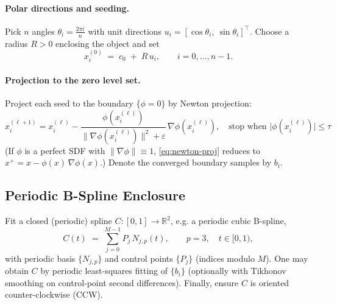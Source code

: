 \documentclass[conference]{IEEEtran}
\begin{document}
\paragraph{Polar directions and seeding.}
Pick $n$ angles $\theta_i=\tfrac{2\pi i}{n}$ with unit directions $u_i=[\cos\theta_i,\ \sin\theta_i]^\top$. Choose a radius $R>0$ enclosing the object and set
\begin{equation}
x_i^{(0)} \;=\; c_0 \;+\; R\,u_i,\qquad i=0,\dots,n-1.
\end{equation}

\paragraph{Projection to the zero level set.}
Project each seed to the boundary $\{\phi=0\}$ by Newton projection:
\begin{equation}
x_i^{(\ell+1)} = x_i^{(\ell)} - \frac{\phi\!\left(x_i^{(\ell)}\right)}{\|\nabla\phi\!\left(x_i^{(\ell)}\right)\|^2+\varepsilon}\,\nabla\phi\!\left(x_i^{(\ell)}\right),
\quad \text{stop when } \big|\phi(x_i^{(\ell)})\big| \le \tau
\label{eq:newton-proj}
\end{equation}
(If $\phi$ is a perfect SDF with $\|\nabla\phi\|\equiv 1$, \eqref{eq:newton-proj} reduces to $x^+ = x - \phi(x)\,\nabla\phi(x)$.) Denote the converged boundary samples by $b_i$.

\subsection{Periodic B-Spline Enclosure}
\noindent Fit a closed (periodic) spline $C:[0,1]\to\mathbb{R}^2$, e.g. a periodic cubic B-spline,
\begin{equation}
C(t) \;=\; \sum_{j=0}^{M-1} P_j\,N_{j,p}(t),\qquad p=3,\quad t\in[0,1),
\end{equation}
with periodic basis $\{N_{j,p}\}$ and control points $\{P_j\}$ (indices modulo $M$). One may obtain $C$ by periodic least-squares fitting of $\{b_i\}$ (optionally with Tikhonov smoothing on control-point second differences). Finally, ensure $C$ is oriented counter-clockwise (CCW).

\end{document}
